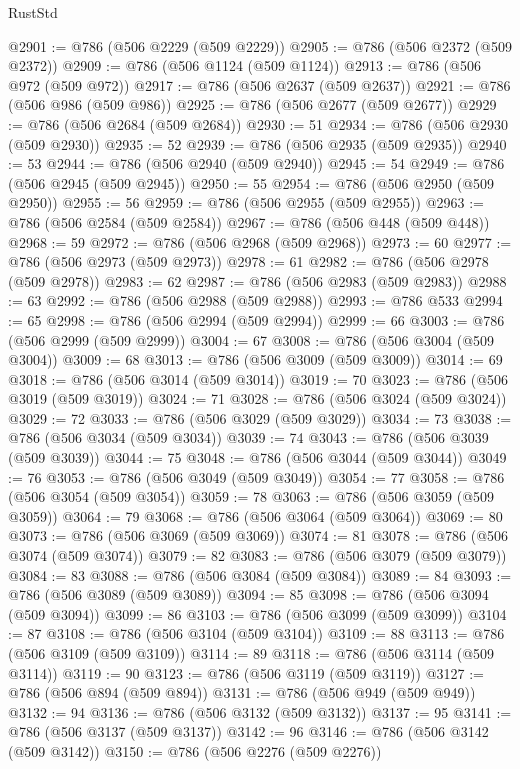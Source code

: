 \begin{lexlean}{RustStd}
\begin{coremodule}
{\begin{coremodule}
{{{{{{{{{{{{{{{{{{{{{{{{{{{{{{{{{{{{{{{{{{{{{{{{{{{{{{{@2901 := @786 (@506 @2229 (@509 @2229))
@2905 := @786 (@506 @2372 (@509 @2372))
@2909 := @786 (@506 @1124 (@509 @1124))
@2913 := @786 (@506 @972 (@509 @972))
@2917 := @786 (@506 @2637 (@509 @2637))
@2921 := @786 (@506 @986 (@509 @986))
@2925 := @786 (@506 @2677 (@509 @2677))
@2929 := @786 (@506 @2684 (@509 @2684))
@2930 := 51
@2934 := @786 (@506 @2930 (@509 @2930))
@2935 := 52
@2939 := @786 (@506 @2935 (@509 @2935))
@2940 := 53
@2944 := @786 (@506 @2940 (@509 @2940))
@2945 := 54
@2949 := @786 (@506 @2945 (@509 @2945))
@2950 := 55
@2954 := @786 (@506 @2950 (@509 @2950))
@2955 := 56
@2959 := @786 (@506 @2955 (@509 @2955))
@2963 := @786 (@506 @2584 (@509 @2584))
@2967 := @786 (@506 @448 (@509 @448))
@2968 := 59
@2972 := @786 (@506 @2968 (@509 @2968))
@2973 := 60
@2977 := @786 (@506 @2973 (@509 @2973))
@2978 := 61
@2982 := @786 (@506 @2978 (@509 @2978))
@2983 := 62
@2987 := @786 (@506 @2983 (@509 @2983))
@2988 := 63
@2992 := @786 (@506 @2988 (@509 @2988))
@2993 := @786 @533
@2994 := 65
@2998 := @786 (@506 @2994 (@509 @2994))
@2999 := 66
@3003 := @786 (@506 @2999 (@509 @2999))
@3004 := 67
@3008 := @786 (@506 @3004 (@509 @3004))
@3009 := 68
@3013 := @786 (@506 @3009 (@509 @3009))
@3014 := 69
@3018 := @786 (@506 @3014 (@509 @3014))
@3019 := 70
@3023 := @786 (@506 @3019 (@509 @3019))
@3024 := 71
@3028 := @786 (@506 @3024 (@509 @3024))
@3029 := 72
@3033 := @786 (@506 @3029 (@509 @3029))
@3034 := 73
@3038 := @786 (@506 @3034 (@509 @3034))
@3039 := 74
@3043 := @786 (@506 @3039 (@509 @3039))
@3044 := 75
@3048 := @786 (@506 @3044 (@509 @3044))
@3049 := 76
@3053 := @786 (@506 @3049 (@509 @3049))
@3054 := 77
@3058 := @786 (@506 @3054 (@509 @3054))
@3059 := 78
@3063 := @786 (@506 @3059 (@509 @3059))
@3064 := 79
@3068 := @786 (@506 @3064 (@509 @3064))
@3069 := 80
@3073 := @786 (@506 @3069 (@509 @3069))
@3074 := 81
@3078 := @786 (@506 @3074 (@509 @3074))
@3079 := 82
@3083 := @786 (@506 @3079 (@509 @3079))
@3084 := 83
@3088 := @786 (@506 @3084 (@509 @3084))
@3089 := 84
@3093 := @786 (@506 @3089 (@509 @3089))
@3094 := 85
@3098 := @786 (@506 @3094 (@509 @3094))
@3099 := 86
@3103 := @786 (@506 @3099 (@509 @3099))
@3104 := 87
@3108 := @786 (@506 @3104 (@509 @3104))
@3109 := 88
@3113 := @786 (@506 @3109 (@509 @3109))
@3114 := 89
@3118 := @786 (@506 @3114 (@509 @3114))
@3119 := 90
@3123 := @786 (@506 @3119 (@509 @3119))
@3127 := @786 (@506 @894 (@509 @894))
@3131 := @786 (@506 @949 (@509 @949))
@3132 := 94
@3136 := @786 (@506 @3132 (@509 @3132))
@3137 := 95
@3141 := @786 (@506 @3137 (@509 @3137))
@3142 := 96
@3146 := @786 (@506 @3142 (@509 @3142))
@3150 := @786 (@506 @2276 (@509 @2276))
}}}}}}}}}}}}}}}}}}}}}}}}}}}}}}}}}}}}}}}}}}}}}}}}}}}}}}}
\end{coremodule}}
\end{coremodule}
\end{lexlean}
